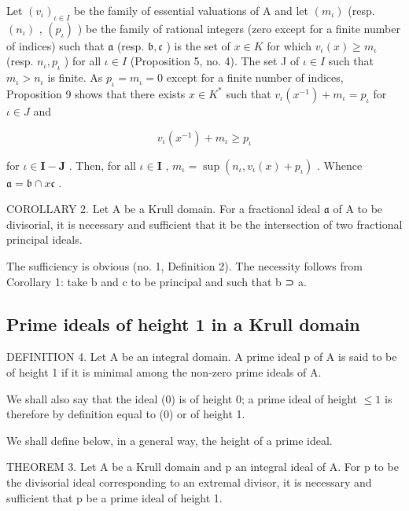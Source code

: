 Let \((v_{\iota})_{\iota \in I}\) be the family of essential valuations of A and let \((m_{\iota})\) (resp. \((n_{\iota})\) , \((p_{\iota})\) ) be the family of rational integers (zero except for a finite number of indices) such that \(\mathfrak{a}\) (resp. \(\mathfrak{b}, \mathfrak{c}\) ) is the set of \(x \in K\) for which \(v_{\iota}(x) \geqslant m_{\iota}\) (resp. \(n_{\iota}, p_{\iota}\) ) for all \(\iota \in I\) (Proposition 5, no. 4). The set J of \(\iota \in I\) such that \(m_{\iota} > n_{\iota}\) is finite. As \(p_{\iota} = m_{\iota} = 0\) except for a finite number of indices, Proposition 9 shows that there exists \(x \in K^{*}\) such that \(v_{\iota}(x^{-1}) + m_{\iota} = p_{\iota}\) for \(\iota \in J\) and

\[
v _ {\iota} (x ^ {- 1}) + m _ {\iota} \geqslant p _ {\iota}
\]

for \(\iota \in \mathbf{I} - \mathbf{J}\) . Then, for all \(\iota \in \mathbf{I}\) , \(m_{\iota} = \sup (n_{\iota}, v_{\iota}(x) + p_{\iota})\) . Whence \(\mathfrak{a} = \mathfrak{b} \cap x\mathfrak{c}\) .

COROLLARY 2. Let A be a Krull domain. For a fractional ideal \(\mathfrak{a}\) of A to be divisorial, it is necessary and sufficient that it be the intersection of two fractional principal ideals.

The sufficiency is obvious (no. 1, Definition 2). The necessity follows from Corollary 1: take b and c to be principal and such that b ⊃ a.

\subsection{Prime ideals of height 1 in a Krull domain}

DEFINITION 4. Let A be an integral domain. A prime ideal p of A is said to be of height 1 if it is minimal among the non-zero prime ideals of A.

We shall also say that the ideal (0) is of height 0; a prime ideal of height \(\leqslant 1\) is therefore by definition equal to (0) or of height 1.

We shall define below, in a general way, the height of a prime ideal.

THEOREM 3. Let A be a Krull domain and p an integral ideal of A. For p to be the divisorial ideal corresponding to an extremal divisor, it is necessary and sufficient that p be a prime ideal of height 1.

